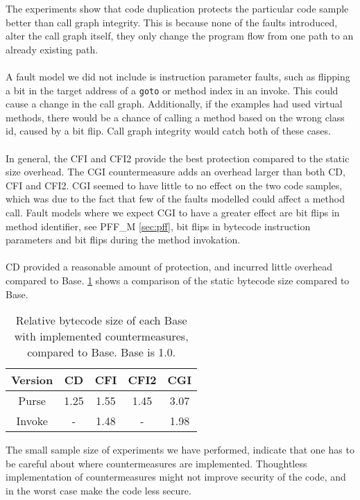 The experiments show that code duplication protects the particular code sample better than call graph integrity. This is because none of the faults introduced, alter the call graph itself, they only change the program flow from one path to an already existing path.\\\\
A fault model we did not include is instruction parameter faults, such as flipping a bit in the target address of a \texttt{goto} or method index in an invoke. This could cause a change in the call graph. Additionally, if the examples had used virtual methods, there would be a chance of calling a method based on the wrong class id, caused by a bit flip. Call graph integrity would catch both of these cases.\\\\
In general, the CFI and CFI2 provide the best protection compared to the static size overhead. The CGI countermeasure adds an overhead larger than both CD, CFI and CFI2. CGI seemed to have little to no effect on the two code samples, which was due to the fact that few of the faults modelled could affect a method call. Fault models where we expect CGI to have a greater effect are bit flips in method identifier, see PFF\_M \cref{sec:pff}, bit flips in bytecode instruction parameters and bit flips during the method invokation.\\\\
CD provided a reasonable amount of protection, and incurred little overhead compared to Base. \cref{tab:staticSize} shows a comparison of the static bytecode size compared to Base.

\begin{table}[H]
\centering
\begin{tabular}{|c|c|c|c|c|}
\hline Version & CD & CFI & CFI2 & CGI \\ 
\hline Purse & 1.25 & 1.55 & 1.45 & 3.07 \\ 
\hline Invoke & - & 1.48 & - & 1.98 \\ 
\hline 
\end{tabular} 
    \caption{Relative bytecode size of each Base with implemented countermeasures, compared to Base. Base is 1.0.}
\label{tab:staticSize}
\end{table}

\noindent The small sample size of experiments we have performed, indicate that one has to be careful about where countermeasures are implemented. Thoughtless implementation of countermeasures might not improve security of the code, and in the worst case make the code less secure. 